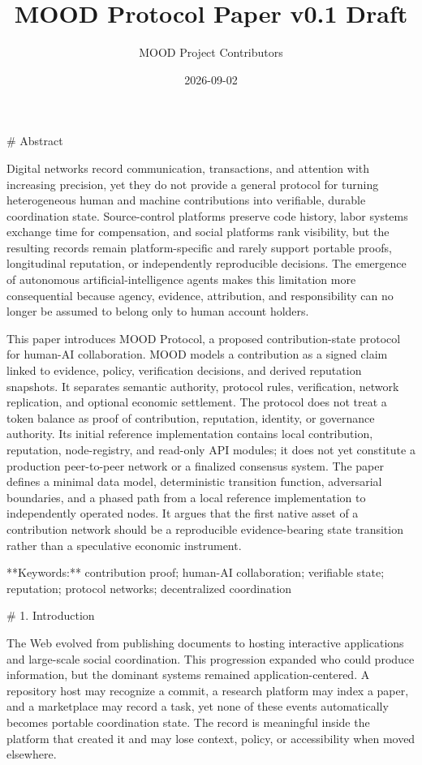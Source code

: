 \documentclass[10pt,a4paper]{article}
\title{MOOD Protocol Paper v0.1 Draft}
\author{MOOD Project Contributors}
\date{2026-09-02}
\begin{document}
\maketitle

\# Abstract

Digital networks record communication, transactions, and attention with increasing precision, yet they do not provide a general protocol for turning heterogeneous human and machine contributions into verifiable, durable coordination state. Source-control platforms preserve code history, labor systems exchange time for compensation, and social platforms rank visibility, but the resulting records remain platform-specific and rarely support portable proofs, longitudinal reputation, or independently reproducible decisions. The emergence of autonomous artificial-intelligence agents makes this limitation more consequential because agency, evidence, attribution, and responsibility can no longer be assumed to belong only to human account holders.

This paper introduces MOOD Protocol, a proposed contribution-state protocol for human-AI collaboration. MOOD models a contribution as a signed claim linked to evidence, policy, verification decisions, and derived reputation snapshots. It separates semantic authority, protocol rules, verification, network replication, and optional economic settlement. The protocol does not treat a token balance as proof of contribution, reputation, identity, or governance authority. Its initial reference implementation contains local contribution, reputation, node-registry, and read-only API modules; it does not yet constitute a production peer-to-peer network or a finalized consensus system. The paper defines a minimal data model, deterministic transition function, adversarial boundaries, and a phased path from a local reference implementation to independently operated nodes. It argues that the first native asset of a contribution network should be a reproducible evidence-bearing state transition rather than a speculative economic instrument.

**Keywords:** contribution proof; human-AI collaboration; verifiable state; reputation; protocol networks; decentralized coordination

\# 1. Introduction

The Web evolved from publishing documents to hosting interactive applications and large-scale social coordination. This progression expanded who could produce information, but the dominant systems remained application-centered. A repository host may recognize a commit, a research platform may index a paper, and a marketplace may record a task, yet none of these events automatically becomes portable coordination state. The record is meaningful inside the platform that created it and may lose context, policy, or accessibility when moved elsewhere.
\end{document}
